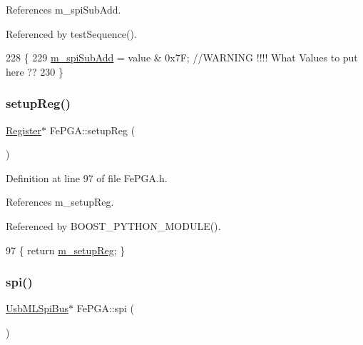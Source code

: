 References m\+\_\+spi\+Sub\+Add.



Referenced by test\+Sequence().


\begin{DoxyCode}
228                                                        \{
229   \hyperlink{classFePGA_a4f2f5d175aeb6dcaf497f81d2f075411}{m\_spiSubAdd} = value & 0x7F;  \textcolor{comment}{//WARNING !!!! What Values to put here ??}
230 \}
\end{DoxyCode}
\mbox{\label{classFePGA_aa0657c6ef809f3f6b54613f237750cc4}} 
\subsubsection{\texorpdfstring{setup\+Reg()}{setupReg()}}
{\footnotesize\ttfamily \hyperlink{classRegister}{Register}$\ast$ Fe\+P\+G\+A\+::setup\+Reg (\begin{DoxyParamCaption}{ }\end{DoxyParamCaption})\hspace{0.3cm}{\ttfamily [inline]}}



Definition at line 97 of file Fe\+P\+G\+A.\+h.



References m\+\_\+setup\+Reg.



Referenced by B\+O\+O\+S\+T\+\_\+\+P\+Y\+T\+H\+O\+N\+\_\+\+M\+O\+D\+U\+L\+E().


\begin{DoxyCode}
97 \{ \textcolor{keywordflow}{return} \hyperlink{classFePGA_a0255fe229013986b4387c3a75ddf4e97}{m\_setupReg};  \}
\end{DoxyCode}
\mbox{\label{classFePGA_ab54f9f61e87f1cced6c4ba19eb38a848}} 
\subsubsection{\texorpdfstring{spi()}{spi()}}
{\footnotesize\ttfamily \hyperlink{classUsbMLSpiBus}{Usb\+M\+L\+Spi\+Bus}$\ast$ Fe\+P\+G\+A\+::spi (\begin{DoxyParamCaption}{ }\end{DoxyParamCaption})\hspace{0.3cm}{\ttfamily [inline]}}



